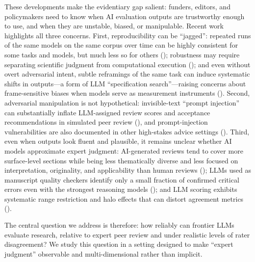 \documentclass[
  11pt,
  letterpaper,
]{article}
\begin{document}
These developments make the evidentiary gap salient: funders, editors,
and policymakers need to know when AI evaluation outputs are trustworthy
enough to use, and when they are unstable, biased, or manipulable.
Recent work highlights all three concerns. First, reproducibility can be
``jagged'': repeated runs of the same models on the same corpus over
time can be highly consistent for some tasks and models, but much less
so for others (); robustness may require separating scientific
judgment from computational execution (); and even without overt adversarial intent, subtle
reframings of the same task can induce systematic shifts in outputs---a
form of LLM ``specification search''---raising concerns about
frame-sensitive biases when models serve as measurement instruments
(). Second, adversarial manipulation is not hypothetical:
invisible-text ``prompt injection'' can substantially inflate
LLM-assigned review scores and acceptance recommendations in simulated
peer review (), and
prompt-injection vulnerabilities are also documented in other
high-stakes advice settings (). Third, even when outputs look fluent and plausible, it remains
unclear whether AI models approximate expert judgment: AI-generated
reviews tend to cover more surface-level sections while being less
thematically diverse and less focused on interpretation, originality,
and applicability than human reviews
(); LLMs
used as manuscript quality checkers identify only a small fraction of
confirmed critical errors even with the strongest reasoning models
(); and LLM scoring
exhibits systematic range restriction and halo effects that can distort
agreement metrics ().

The central question we address is therefore: how reliably can frontier
LLMs evaluate research, relative to expert peer review and under
realistic levels of rater disagreement? We study this question in a
setting designed to make ``expert judgment'' observable and
multi-dimensional rather than implicit.
\end{document}
